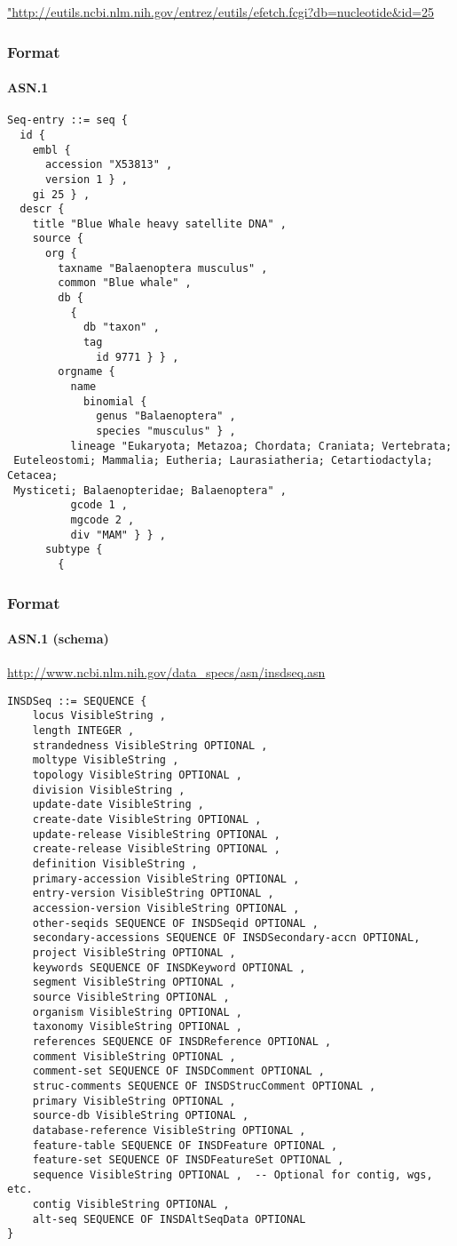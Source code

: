 \documentclass{beamer}
\begin{document}
\begin{frame}[fragile]
\url{"http://eutils.ncbi.nlm.nih.gov/entrez/eutils/efetch.fcgi?db=nucleotide&id=25}
\frametitle{Format}
\framesubtitle{ASN.1}
\begin{lstlisting}[basicstyle=\tiny,breaklines=false]
Seq-entry ::= seq {
  id {
    embl {
      accession "X53813" ,
      version 1 } ,
    gi 25 } ,
  descr {
    title "Blue Whale heavy satellite DNA" ,
    source {
      org {
        taxname "Balaenoptera musculus" ,
        common "Blue whale" ,
        db {
          {
            db "taxon" ,
            tag
              id 9771 } } ,
        orgname {
          name
            binomial {
              genus "Balaenoptera" ,
              species "musculus" } ,
          lineage "Eukaryota; Metazoa; Chordata; Craniata; Vertebrata;
 Euteleostomi; Mammalia; Eutheria; Laurasiatheria; Cetartiodactyla; Cetacea;
 Mysticeti; Balaenopteridae; Balaenoptera" ,
          gcode 1 ,
          mgcode 2 ,
          div "MAM" } } ,
      subtype {
        {
\end{lstlisting}
\end{frame}


\begin{frame}[fragile]
\frametitle{Format}
\framesubtitle{ASN.1 (schema)}
\url{http://www.ncbi.nlm.nih.gov/data_specs/asn/insdseq.asn}
\begin{lstlisting}[basicstyle=\tiny,breaklines=false]
INSDSeq ::= SEQUENCE {
    locus VisibleString ,
    length INTEGER ,
    strandedness VisibleString OPTIONAL ,
    moltype VisibleString ,
    topology VisibleString OPTIONAL ,
    division VisibleString ,
    update-date VisibleString ,
    create-date VisibleString OPTIONAL ,
    update-release VisibleString OPTIONAL ,
    create-release VisibleString OPTIONAL ,
    definition VisibleString ,
    primary-accession VisibleString OPTIONAL ,
    entry-version VisibleString OPTIONAL ,
    accession-version VisibleString OPTIONAL ,
    other-seqids SEQUENCE OF INSDSeqid OPTIONAL ,
    secondary-accessions SEQUENCE OF INSDSecondary-accn OPTIONAL,
    project VisibleString OPTIONAL ,
    keywords SEQUENCE OF INSDKeyword OPTIONAL ,
    segment VisibleString OPTIONAL ,
    source VisibleString OPTIONAL ,
    organism VisibleString OPTIONAL ,
    taxonomy VisibleString OPTIONAL ,
    references SEQUENCE OF INSDReference OPTIONAL ,
    comment VisibleString OPTIONAL ,
    comment-set SEQUENCE OF INSDComment OPTIONAL ,
    struc-comments SEQUENCE OF INSDStrucComment OPTIONAL ,
    primary VisibleString OPTIONAL ,
    source-db VisibleString OPTIONAL ,
    database-reference VisibleString OPTIONAL ,
    feature-table SEQUENCE OF INSDFeature OPTIONAL ,
    feature-set SEQUENCE OF INSDFeatureSet OPTIONAL ,
    sequence VisibleString OPTIONAL ,  -- Optional for contig, wgs, etc.
    contig VisibleString OPTIONAL ,
    alt-seq SEQUENCE OF INSDAltSeqData OPTIONAL
}
\end{lstlisting}
\end{frame}
\end{document}
